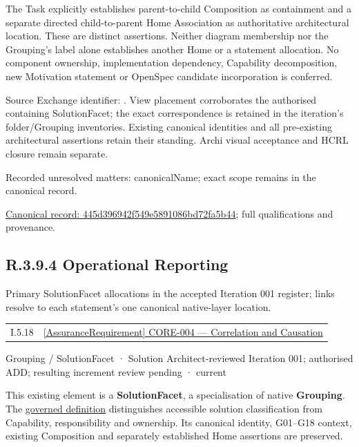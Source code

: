 The Task explicitly establishes parent-to-child Composition as containment and
a separate directed child-to-parent Home Association as authoritative architectural
location. These are distinct assertions. Neither diagram membership nor the
Grouping's label alone establishes another Home or a statement allocation.
No component ownership, implementation dependency, Capability decomposition,
new Motivation statement or OpenSpec candidate incorporation is conferred.



Source Exchange identifier: \texttt{}. View placement corroborates
the authorised containing SolutionFacet; the exact correspondence is retained in the
iteration's folder/Grouping inventories. Existing canonical identities and all
pre-existing architectural assertions retain their standing. Archi visual
acceptance and HCRL closure remain separate.


{\small Recorded unresolved matters: canonicalName; exact scope remains in the canonical record.}\par
{\footnotesize \href{../../../../../../../continuum/grouping/445d396942f549e5891086bd72fa5b44.md}{Canonical record: 445d396942f549e5891086bd72fa5b44}; full qualifications and provenance.}\par
\subsection*{R.3.9.4 Operational Reporting}
\label{navigation:R.3.9.4}

Primary SolutionFacet allocations in the accepted Iteration 001 register; links resolve to each statement’s one canonical native-layer location.\par
\begin{longtable}{p{.22\linewidth}p{.73\linewidth}}
I.5.18 & \hyperref[element:f2e504e7d6374e41a81303265adda6de]{[AssuranceRequirement] CORE-004 — Correlation and Causation} \\
\end{longtable}
\label{element:b92ea843bd6342879b6a3be255743e31}
{\small Grouping / SolutionFacet · Solution Architect-reviewed Iteration 001; authorised ADD; resulting increment review pending · current}\par

This existing element is a \textbf{SolutionFacet}, a specialisation of native
\textbf{Grouping}. The \href{\detokenize{../../../../../../../governance/continuum-representation.md#solutionfacet-classification--1119-candidate}}{governed definition}
distinguishes accessible solution classification from Capability, responsibility
and ownership. Its canonical identity, G01–G18 context, existing Composition
and separately established Home assertions are preserved.



